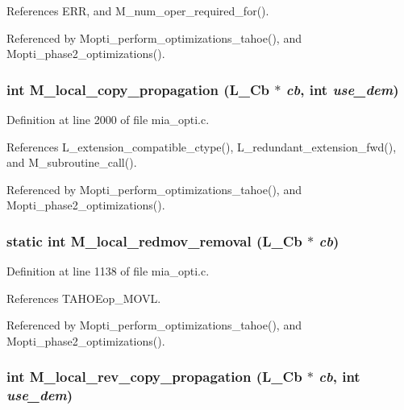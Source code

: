 References ERR, and M\_\-num\_\-oper\_\-required\_\-for().

Referenced by Mopti\_\-perform\_\-optimizations\_\-tahoe(), and Mopti\_\-phase2\_\-optimizations().
\subsubsection{\setlength{\rightskip}{0pt plus 5cm}int M\_\-local\_\-copy\_\-propagation (L\_\-Cb $\ast$ {\em cb}, int {\em use\_\-dem})}\label{mia__opti_8c_c1d1622c65471a90dd6bc5177f3b781c}




Definition at line 2000 of file mia\_\-opti.c.

References L\_\-extension\_\-compatible\_\-ctype(), L\_\-redundant\_\-extension\_\-fwd(), and M\_\-subroutine\_\-call().

Referenced by Mopti\_\-perform\_\-optimizations\_\-tahoe(), and Mopti\_\-phase2\_\-optimizations().
\subsubsection{\setlength{\rightskip}{0pt plus 5cm}static int M\_\-local\_\-redmov\_\-removal (L\_\-Cb $\ast$ {\em cb})\hspace{0.3cm}{\tt  [static]}}\label{mia__opti_8c_ed2068a7c6bbc404d8f5efc063bac047}




Definition at line 1138 of file mia\_\-opti.c.

References TAHOEop\_\-MOVL.

Referenced by Mopti\_\-perform\_\-optimizations\_\-tahoe(), and Mopti\_\-phase2\_\-optimizations().
\subsubsection{\setlength{\rightskip}{0pt plus 5cm}int M\_\-local\_\-rev\_\-copy\_\-propagation (L\_\-Cb $\ast$ {\em cb}, int {\em use\_\-dem})}\label{mia__opti_8c_fdb6e98593a83266abde366ac047f0a4}




